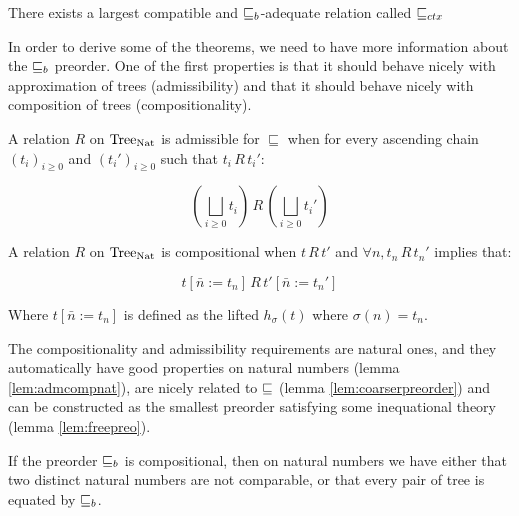 \begin{adefinition}
    There exists a largest compatible and $\sqsubseteq_b$-adequate 
    relation called $\sqsubseteq_{ctx}$
\end{adefinition}

In order to derive some of the theorems, we need to have more information 
about the $\sqsubseteq_b$ preorder. One of the first properties is that 
it should behave nicely with approximation of trees (admissibility) and 
that it should behave nicely with composition of trees (compositionality).

\vspace{1em}

\begin{adefinition}[Admissibility]
    A relation $R$ on $\textnormal{Tree}_{\textnormal{Nat}}$ is admissible for $\sqsubseteq$ when 
    for every ascending chain $(t_i)_{i \geq 0}$ and 
    $(t_i')_{i\geq 0}$ such that $t_i \, R \, t_i'$:

    \[
        \left(\bigsqcup_{i \geq 0} t_i\right) \, R \, \left(\bigsqcup_{i \geq 0} t_i'\right)
    \]
\end{adefinition}

\begin{adefinition}[Compositionality]
    A relation $R$ on $\textnormal{Tree}_{\textnormal{Nat}}$ is compositional when 
    $t \, R \, t'$ and $\forall n, t_n \, R \, t_n'$ 
    implies that:
    
    \[
        t[ \bar{n} := t_n] \, R \, t'[ \bar{n} := t_n']
    \]

    Where $t[ \bar{n} := t_n]$ is defined as the lifted 
    $h_\sigma (t)$
    where $\sigma (n) = t_n$.
\end{adefinition}

The compositionality and admissibility requirements are 
natural ones, and they automatically have good properties 
on natural numbers (lemma \ref{lem:admcompnat}),
are nicely related to $\sqsubseteq$ (lemma \ref{lem:coarserpreorder})
and can be constructed as the smallest preorder 
satisfying some inequational theory (lemma \ref{lem:freepreo}).

\begin{alemma}
    \label{lem:admcompnat}
    If the preorder $\sqsubseteq_b$ is  
    compositional, then on natural 
    numbers we have either that two distinct 
    natural numbers are not comparable, 
    or that every pair of tree is equated  
    by $\sqsubseteq_b$.
\end{alemma}



